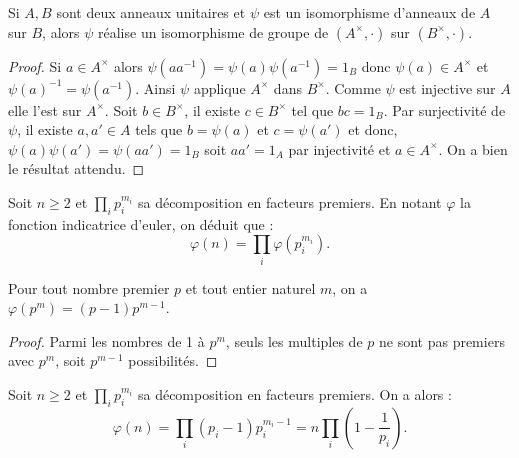 \begin{lem}
\label{lem:2}
Si $A, B$ sont deux anneaux unitaires et $\psi$ est un isomorphisme d'anneaux de $A$ sur $B$, 
alors $\psi$ réalise un isomorphisme de groupe de $(A^{\times}, \cdot)$ sur $(B^{\times}, \cdot)$.
\end{lem}

\begin{proof}
Si $a \in A^{\times}$ alors $\psi(aa^{-1}) = \psi(a) \psi(a^{-1}) = 1_B$ donc $\psi(a) \in A^{\times}$ 
et $\psi(a)^{-1} = \psi(a^{-1})$. Ainsi $\psi$ applique $A^{\times}$ dans $B^{\times}$.
Comme $\psi$ est injective sur $A$ elle l'est sur $A^{\times}$.
Soit $b \in B^{\times}$, il existe $c \in B^{\times}$ tel que $bc=1_B$. 
Par surjectivité de $\psi$, il existe $a, a' \in A$ tels que $b=\psi(a)$ et $c=\psi(a')$ et donc,
$\psi(a)\psi(a') = \psi(aa') = 1_B$ soit $aa' = 1_A$ par injectivité et $a \in A^{\times}$.
On a bien le résultat attendu.
\end{proof}

\begin{coro}
Soit $n \geq 2$ et $\prod_i p_i^{m_i}$ sa décomposition en facteurs premiers.
En notant $\varphi$ la fonction indicatrice d'euler, on déduit que :
\[ \varphi(n) = \prod_i \varphi(p_i^{m_i}) . \]
\end{coro}

\begin{lem}
Pour tout nombre premier $p$ et tout entier naturel $m$, on a $\varphi(p^m) = (p-1) p^{m-1}$.
\end{lem}

\begin{proof}
Parmi les nombres de 1 à $p^m$, seuls les multiples de $p$ ne sont pas premiers avec $p^m$, soit $p^{m-1}$ possibilités.
\end{proof}

\begin{thm}
Soit $n \geq 2$ et $\prod_i p_i^{m_i}$ sa décomposition en facteurs premiers.
On a alors :
\[ \varphi(n) = \prod_i (p_i-1) p_i^{m_i-1} = n \prod_i \left ( 1 - \dfrac1{p_i} \right ) . \]
\end{thm}

